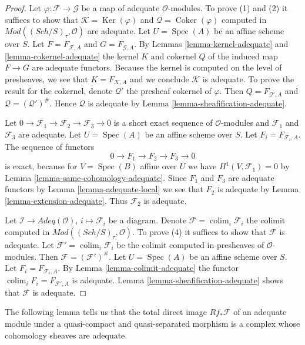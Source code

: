 \documentclass{stacks-project}
\theoremstyle{plain}
\theoremstyle{definition}
\theoremstyle{remark}
\numberwithin{equation}{subsection}
\def\colim{\mathop{\mathrm{colim}}\nolimits}
\def\Spec{\mathop{\mathrm{Spec}}}
\def\Sch{\mathit{Sch}}
\def\Ker{\mathop{\mathrm{Ker}}}
\def\Coker{\mathop{\mathrm{Coker}}}
\begin{document}
\begin{proof}
Let $\varphi : \mathcal{F} \to \mathcal{G}$ be a map of adequate
$\mathcal{O}$-modules. To prove (1) and (2) it suffices to show that
$\mathcal{K} = \Ker(\varphi)$ and
$\mathcal{Q} = \Coker(\varphi)$ computed in
$\textit{Mod}((\Sch/S)_\tau, \mathcal{O})$ are adequate.
Let $U = \Spec(A)$ be an affine scheme over $S$.
Let $F = F_{\mathcal{F}, A}$ and $G = F_{\mathcal{G}, A}$.
By
Lemmas \ref{lemma-kernel-adequate} and
\ref{lemma-cokernel-adequate}
the kernel $K$ and cokernel $Q$ of the induced map
$F \to G$ are adequate functors.
Because the kernel is computed on the level of presheaves, we see
that $K = F_{\mathcal{K}, A}$ and we conclude $\mathcal{K}$ is adequate.
To prove the result for the cokernel, denote $\mathcal{Q}'$ the presheaf
cokernel of $\varphi$. Then $Q = F_{\mathcal{Q}', A}$ and
$\mathcal{Q} = (\mathcal{Q}')^\#$. Hence $\mathcal{Q}$
is adequate by
Lemma \ref{lemma-sheafification-adequate}.

\medskip\noindent
Let $0 \to \mathcal{F}_1 \to \mathcal{F}_2 \to \mathcal{F}_3 \to 0$
is a short exact sequence of $\mathcal{O}$-modules and
$\mathcal{F}_1$ and $\mathcal{F}_3$ are adequate.
Let $U = \Spec(A)$ be an affine scheme over $S$.
Let $F_i = F_{\mathcal{F}_i, A}$. The sequence of functors
$$
0 \to F_1 \to F_2 \to F_3 \to 0
$$
is exact, because for $V = \Spec(B)$ affine over $U$ we have
$H^1(V, \mathcal{F}_1) = 0$ by
Lemma \ref{lemma-same-cohomology-adequate}.
Since $F_1$ and $F_3$ are adequate functors by
Lemma \ref{lemma-adequate-local}
we see that $F_2$ is adequate by
Lemma \ref{lemma-extension-adequate}.
Thus $\mathcal{F}_2$ is adequate.

\medskip\noindent
Let $\mathcal{I} \to \textit{Adeq}(\mathcal{O})$, $i \mapsto \mathcal{F}_i$
be a diagram. Denote $\mathcal{F} = \colim_i \mathcal{F}_i$
the colimit computed in
$\textit{Mod}((\Sch/S)_\tau, \mathcal{O})$.
To prove (4) it suffices to show that $\mathcal{F}$ is adequate.
Let $\mathcal{F}' = \colim_i \mathcal{F}_i$ be the colimit computed
in presheaves of $\mathcal{O}$-modules. Then
$\mathcal{F} = (\mathcal{F}')^\#$.
Let $U = \Spec(A)$ be an affine scheme over $S$.
Let $F_i = F_{\mathcal{F}_i, A}$. By
Lemma \ref{lemma-colimit-adequate}
the functor $\colim_i F_i = F_{\mathcal{F}', A}$ is adequate.
Lemma \ref{lemma-sheafification-adequate}
shows that $\mathcal{F}$ is adequate.
\end{proof}

\noindent
The following lemma tells us that the total direct image
$Rf_*\mathcal{F}$ of an adequate module under a quasi-compact and
quasi-separated morphism is a complex whose cohomology sheaves
are adequate.
\end{document}
